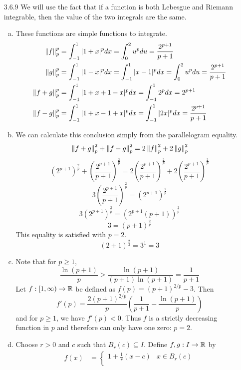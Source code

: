\documentclass[../../Solutions.tex]{subfiles}
\begin{document}
\begin{itemize}
	\item [3.6.9] We will use the fact that if a function is both Lebesgue and Riemann integrable, then the value of the two integrals are the same.
	\begin{enumerate}[(a)]
		\item These functions are simple functions to integrate.
		\begin{equation*} \begin{split} 
			\left\lVert f\right\rVert_p^p & = \int_{-1}^{1} |1+x|^p dx = \int_0^2 u^p du = \frac{2^{p+1}}{p+1} \\
			\left\lVert g\right\rVert_p^p & = \int_{-1}^{1} |1-x|^p dx = \int_{-1}^1 |x-1|^p dx = \int_0^2 u^p du = \frac{2^{p+1}}{p+1} \\
			\left\lVert f+g\right\rVert_p^p & = \int_{-1}^1 |1+x+1-x|^p dx = \int_{-1}^1 2^p dx = 2^{p+1} \\
			\left\lVert f-g\right\rVert_p^p & = \int_{-1}^1 |1+x-1+x|^p dx = \int_{-1}^1 |2x|^p dx = \frac{2^{p+1}}{p+1}
		\end{split} \end{equation*}
		\item We can calculate this conclusion simply from the parallelogram equality.
			$$ \left\lVert f+g\right\rVert_p^2 + \left\lVert f-g\right\rVert_p^2 = 2\left\lVert f\right\rVert_p^2 + 2\left\lVert g\right\rVert_p^2 $$
			$$ \left(2^{p+1}\right)^{\frac{2}{p}} + \left(\frac{2^{p+1}}{p+1}\right)^{\frac{2}{p}} = 2\left(\frac{2^{p+1}}{p+1}\right)^{\frac{2}{p}} + 2\left(\frac{2^{p+1}}{p+1}\right)^{\frac{2}{p}} $$
			$$ 3\left(\frac{2^{p+1}}{p+1}\right)^{\frac{2}{p}} = \left(2^{p+1}\right)^{\frac{2}{p}} $$
			$$ 3\left(2^{p+1}\right)^{\frac{2}{p}} = \left(2^{p+1}(p+1)\right)^{\frac{2}{p}} $$
			$$ 3 = (p+1)^{\frac{2}{p}} $$
			This equality is satisfied with $p = 2$.
			$$ (2+1)^\frac{2}{2} = 3^1 = 3 $$
		\item Note that for $p \geq 1$,
			$$ \frac{\ln(p+1)}{p} > \frac{\ln(p+1)}{(p+1)\ln(p+1)} = \frac{1}{p+1} $$
			Let $f:[1,\infty)\to\mathbb{R}$ be defined as $f(p) = (p+1)^{2/p} - 3$.
			Then
			$$ f'(p) = \frac{2(p+1)^{2/p}}{p}\left(\frac{1}{p+1} - \frac{\ln(p+1)}{p}\right) $$
			and for $p \geq 1$, we have $f'(p) < 0$.
			Thus $f$ is a strictly decreasing function in $p$ and therefore can only have one zero: $p = 2$.
		\item Choose $r > 0$ and $c$ such that $B_r(c) \subseteq I$.
			Define $f,g:I\to\mathbb{R}$ by
			\begin{equation*} \begin{split}
				f(x) &= \begin{cases}
					1+\frac{1}{r}(x-c) & x \in B_r(c) \\

\end{cases}
\end{split}
\end{equation*}
\end{enumerate}
\end{itemize}
\end{document}
